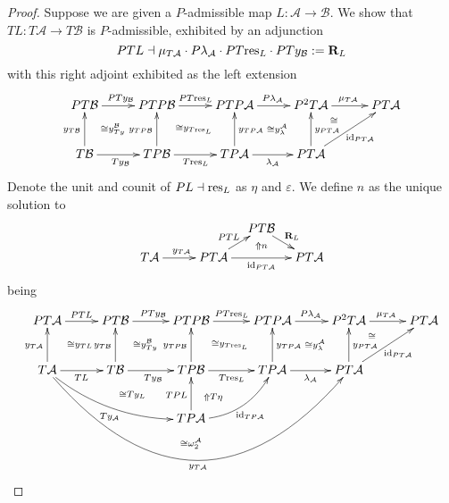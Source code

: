 \documentclass[a4paper,oneside,english]{amsart}
\numberwithin{equation}{section}
\numberwithin{figure}{section}
\theoremstyle{plain}
\theoremstyle{definition}
\theoremstyle{remark}
\theoremstyle{definition}
\theoremstyle{plain}
\theoremstyle{plain}
\theoremstyle{plain}
\begin{document}
\begin{proof}
Suppose we are given a $P$-admissible map $L\colon\mathcal{A}\to\mathcal{B}$.
We show that $TL\colon T\mathcal{A}\to T\mathcal{B}$ is $P$-admissible,
exhibited by an adjunction
\[
PTL\dashv\mu_{T\mathcal{A}}\cdot P\lambda_{\mathcal{A}}\cdot PT\textnormal{res}_{L}\cdot PTy_{\mathcal{B}}:=\mathbf{R}_{L}
\]
with this right adjoint exhibited as the left extension
\[
\xymatrix@=1em{PT\mathcal{B}\ar[rr]^{PTy_{\mathcal{B}}}\ar@{}[rdrd]|-{\cong y_{Ty}^{\mathcal{B}}\quad} &  & PTP\mathcal{B}\ar[rr]^{PT\textnormal{res}_{L}}\ar@{}[rdrd]|-{\cong y_{T\textnormal{res}_{L}}} &  & PTP\mathcal{A}\ar[rr]^{P\lambda_{\mathcal{A}}}\ar@{}[rdrd]|-{\quad\cong y_{\lambda}^{\mathcal{A}}} &  & P^{2}T\mathcal{A}\ar[rr]^{\mu_{T\mathcal{A}}}\ar@{}[rd]|-{\cong} &  & PT\mathcal{A}\\
 &  &  &  &  &  &  & \;\\
T\mathcal{B}\ar[uu]^{y_{T\mathcal{B}}}\ar[rr]_{Ty_{\mathcal{B}}} &  & TP\mathcal{B}\ar[uu]^{y_{TP\mathcal{B}}}\ar[rr]_{T\textnormal{res}_{L}} &  & TP\mathcal{A}\ar[rr]_{\lambda_{\mathcal{A}}}\ar[uu]_{y_{TP\mathcal{A}}} &  & PT\mathcal{A}\ar[uu]_{y_{PT\mathcal{A}}}\ar[rruu]_{\textnormal{id}_{PT\mathcal{A}}}
}
\]
Denote the unit and counit of $PL\dashv\textnormal{res}_{L}$ as $\eta$
and ${\varepsilon}$. We define $n$ as the unique solution to
\[
\xymatrix@=1em{ &  &  & PT\mathcal{B}\ar[rd]^{\mathbf{R}_{L}}\\
T\mathcal{A}\ar[rr]^{y_{T\mathcal{A}}} &  & PT\mathcal{A}\ar[rr]_{\textnormal{id}_{PT\mathcal{A}}}\ar[ru]^{PTL} & \;\ar@{}[u]|-{\Uparrow n} & PT\mathcal{A}
}
\]
being
\[
\xymatrix@=1em{PT\mathcal{A}\ar[rr]^{PTL}\ar@{}[rdrd]|-{\cong y_{TL}} &  & PT\mathcal{B}\ar[rr]^{PTy_{\mathcal{B}}}\ar@{}[rdrd]|-{\cong y_{Ty}^{\mathcal{B}}\quad} &  & PTP\mathcal{B}\ar[rr]^{PT\textnormal{res}_{L}}\ar@{}[rdrd]|-{\cong y_{T\textnormal{res}_{L}}} &  & PTP\mathcal{A}\ar[rr]^{P\lambda_{\mathcal{A}}}\ar@{}[rdrd]|-{\quad\cong y_{\lambda}^{\mathcal{A}}} &  & P^{2}T\mathcal{A}\ar[rr]^{\mu_{T\mathcal{A}}}\ar@{}[rd]|-{\cong} &  & PT\mathcal{A}\\
 &  &  &  &  &  &  &  &  & \;\\
T\mathcal{A}\ar[rr]_{TL}\ar[uu]^{y_{T\mathcal{A}}}\ar@/_{1pc}/[rrrrdd]_{Ty_{\mathcal{A}}}\ar@/_{6pc}/[rrrrrrrr]_{y_{T\mathcal{A}}} &  & T\mathcal{B}\ar[uu]^{y_{T\mathcal{B}}}\ar[rr]_{Ty_{\mathcal{B}}} &  & TP\mathcal{B}\ar[uu]^{y_{TP\mathcal{B}}}\ar[rr]_{T\textnormal{res}_{L}}\ar@{}[rdd]|-{\Uparrow T\eta} &  & TP\mathcal{A}\ar[rr]_{\lambda_{\mathcal{A}}}\ar[uu]_{y_{TP\mathcal{A}}} &  & PT\mathcal{A}\ar[uu]_{y_{PT\mathcal{A}}}\ar[rruu]_{\textnormal{id}_{PT\mathcal{A}}}\\
 &  & \ar@{}[r]|-{\cong Ty_{L}} & \;\\
 &  &  &  & TP\mathcal{A}\ar[uu]^{TPL}\ar@/_{1pc}/[rruu]_{\textnormal{id}_{TP\mathcal{A}}} & \;\\
 &  &  &  & \ar@{}[]|-{\cong\omega_{2}^{\mathcal{A}}}
}
\]


\end{proof}
\end{document}

